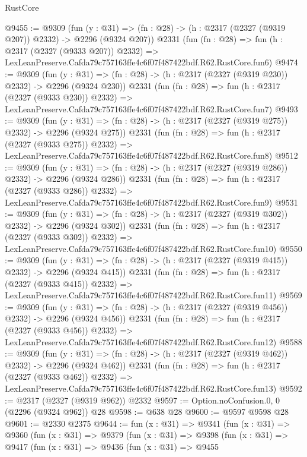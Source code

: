 \begin{lexlean}{RustCore}
\begin{coremodule}
@9455 := @9309
    (fun (y : @31) => (fn : @28) -> (h : @2317 (@2327 (@9319 @207)) @2332) -> @2296 (@9324 @207))
    @2331
    (fun (fn : @28) =>
    fun (h : @2317 (@2327 (@9333 @207)) @2332) =>
    LexLeanPreserve.Cafda79c757163ffe4c6f07f487422bdf.R62.RustCore.fun6)
@9474 := @9309
    (fun (y : @31) => (fn : @28) -> (h : @2317 (@2327 (@9319 @230)) @2332) -> @2296 (@9324 @230))
    @2331
    (fun (fn : @28) =>
    fun (h : @2317 (@2327 (@9333 @230)) @2332) =>
    LexLeanPreserve.Cafda79c757163ffe4c6f07f487422bdf.R62.RustCore.fun7)
@9493 := @9309
    (fun (y : @31) => (fn : @28) -> (h : @2317 (@2327 (@9319 @275)) @2332) -> @2296 (@9324 @275))
    @2331
    (fun (fn : @28) =>
    fun (h : @2317 (@2327 (@9333 @275)) @2332) =>
    LexLeanPreserve.Cafda79c757163ffe4c6f07f487422bdf.R62.RustCore.fun8)
@9512 := @9309
    (fun (y : @31) => (fn : @28) -> (h : @2317 (@2327 (@9319 @286)) @2332) -> @2296 (@9324 @286))
    @2331
    (fun (fn : @28) =>
    fun (h : @2317 (@2327 (@9333 @286)) @2332) =>
    LexLeanPreserve.Cafda79c757163ffe4c6f07f487422bdf.R62.RustCore.fun9)
@9531 := @9309
    (fun (y : @31) => (fn : @28) -> (h : @2317 (@2327 (@9319 @302)) @2332) -> @2296 (@9324 @302))
    @2331
    (fun (fn : @28) =>
    fun (h : @2317 (@2327 (@9333 @302)) @2332) =>
    LexLeanPreserve.Cafda79c757163ffe4c6f07f487422bdf.R62.RustCore.fun10)
@9550 := @9309
    (fun (y : @31) => (fn : @28) -> (h : @2317 (@2327 (@9319 @415)) @2332) -> @2296 (@9324 @415))
    @2331
    (fun (fn : @28) =>
    fun (h : @2317 (@2327 (@9333 @415)) @2332) =>
    LexLeanPreserve.Cafda79c757163ffe4c6f07f487422bdf.R62.RustCore.fun11)
@9569 := @9309
    (fun (y : @31) => (fn : @28) -> (h : @2317 (@2327 (@9319 @456)) @2332) -> @2296 (@9324 @456))
    @2331
    (fun (fn : @28) =>
    fun (h : @2317 (@2327 (@9333 @456)) @2332) =>
    LexLeanPreserve.Cafda79c757163ffe4c6f07f487422bdf.R62.RustCore.fun12)
@9588 := @9309
    (fun (y : @31) => (fn : @28) -> (h : @2317 (@2327 (@9319 @462)) @2332) -> @2296 (@9324 @462))
    @2331
    (fun (fn : @28) =>
    fun (h : @2317 (@2327 (@9333 @462)) @2332) =>
    LexLeanPreserve.Cafda79c757163ffe4c6f07f487422bdf.R62.RustCore.fun13)
@9592 := @2317 (@2327 (@9319 @962)) @2332
@9597 := Option.noConfusion.{0, 0} (@2296 (@9324 @962)) @28
@9598 := @638 @28
@9600 := @9597 @9598 @28
@9601 := @2330 @2375
@9644 := fun (x : @31) =>
  @9341
    (fun (x : @31) =>
    @9360
      (fun (x : @31) =>
      @9379
        (fun (x : @31) =>
        @9398
          (fun (x : @31) =>
          @9417
            (fun (x : @31) =>
            @9436
              (fun (x : @31) =>
              @9455

\end{coremodule}
\end{lexlean}
